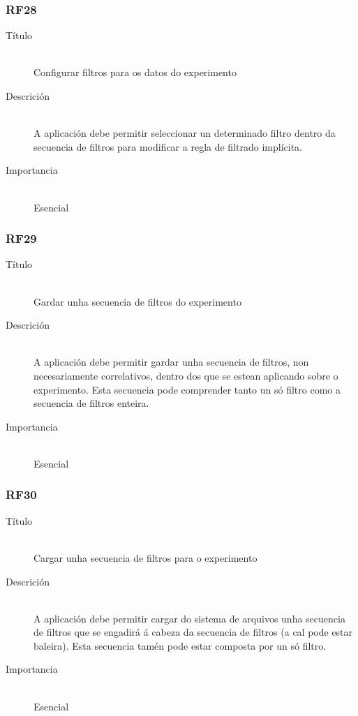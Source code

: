 \subsubsection*{RF28}
\begin{description}
\item[Título] \hfill \\
Configurar filtros para os datos do experimento
\item[Descrición] \hfill \\
A aplicación debe permitir seleccionar un determinado filtro dentro da secuencia de filtros para modificar a regla de filtrado implícita.
\item[Importancia] \hfill \\
Esencial
\end{description}

\subsubsection*{RF29}
\begin{description}
\item[Título] \hfill \\
Gardar unha secuencia de filtros do experimento
\item[Descrición] \hfill \\
A aplicación debe permitir gardar unha secuencia de filtros, non necesariamente correlativos, dentro dos que se estean aplicando sobre o experimento. Esta secuencia pode comprender tanto un só filtro como a secuencia de filtros enteira.
\item[Importancia] \hfill \\
Esencial
\end{description}

\subsubsection*{RF30}
\begin{description}
\item[Título] \hfill \\
Cargar unha secuencia de filtros para o experimento
\item[Descrición] \hfill \\
A aplicación debe permitir cargar do sistema de arquivos unha secuencia de filtros que se engadirá á cabeza da secuencia de filtros (a cal pode estar baleira). Esta secuencia tamén pode estar composta por un só filtro.
\item[Importancia] \hfill \\
Esencial
\end{description}

